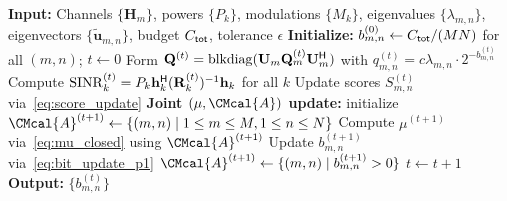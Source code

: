 \documentclass[10pt, twocolumn, comsoc]{IEEEtran}
\newtheorem{remark}{Remark}
\begin{document}
\begin{algorithm}[t]
\caption{Iterative RMWF for (P1)}
\label{alg:rmwf_p1}
\begin{algorithmic}[1]
\STATE \textbf{Input:} Channels $\{\mathbf{H}_m\}$, 
powers $\{P_k\}$, modulations $\{M_k\}$, 
eigenvalues $\{\lambda_{m,n}\}$, eigenvectors 
$\{\mathbf{\tilde u}_{m,n}\}$, budget $C_{\sf tot}$, 
tolerance $\epsilon$
\STATE \textbf{Initialize:} $b_{m,n}^{(0)} 
\leftarrow C_{\sf tot}/(MN)$ for all $(m, n)$; 
$t \leftarrow 0$
\REPEAT
  \STATE Form $\mathbf{Q}^{(t)} = 
         \mathrm{blkdiag}(\mathbf{U}_m \mathbf{Q}_m^{(t)} 
         \mathbf{U}_m^{\sf H})$ with 
         $q_{m,n}^{(t)} = c \lambda_{m,n} \cdot 
         2^{-b_{m,n}^{(t)}}$
  \STATE Compute $\mathrm{SINR}_k^{(t)} 
         = P_k \mathbf{h}_k^{\sf H} 
         (\mathbf{R}_k^{(t)})^{-1} \mathbf{h}_k$ 
         for all $k$
  \STATE Update scores $S_{m,n}^{(t)}$ 
         via~\eqref{eq:score_update}
  \STATE \textbf{Joint $(\mu, \CMcal{A})$ update:} 
         initialize $\CMcal{A}^{(t+1)} \leftarrow 
         \{(m, n) \mid 1 \le m \le M, 1 \le n \le N\}$
  \REPEAT
    \STATE Compute $\mu^{(t+1)}$ 
           via~\eqref{eq:mu_closed} using 
           $\CMcal{A}^{(t+1)}$
    \STATE Update $b_{m,n}^{(t+1)}$ 
           via~\eqref{eq:bit_update_p1}
    \STATE $\CMcal{A}^{(t+1)} \leftarrow 
           \{(m, n) \mid b_{m,n}^{(t+1)} > 0\}$
  \STATE $t \leftarrow t + 1$
\STATE \textbf{Output:} $\{b_{m,n}^{(t)}\}$
\end{algorithmic}
\end{algorithm}


\end{document}

